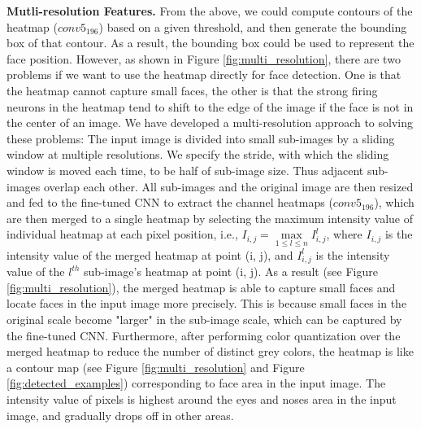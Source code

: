\documentclass[10pt,twocolumn,letterpaper]{article}
\begin{document}
{\bf Mutli-resolution Features.} From the above, we could compute contours of the heatmap ($conv5_{196}$) based on a given threshold, and then generate the bounding box of that contour. As a result, the bounding box could be used to represent the face position. However, as shown in Figure \ref{fig:multi_resolution}, there are two problems if we want to use the heatmap directly for face detection. One is that the heatmap cannot capture small faces, the other is that the strong firing neurons in the heatmap tend to shift to the edge of the image if the face is not in the center of an image. We have developed a multi-resolution approach to solving these problems: The input image is divided into small sub-images by a sliding window at multiple resolutions. We specify the stride, with which the sliding window is moved each time, to be half of sub-image size. Thus adjacent sub-images overlap each other. All sub-images and the original image are then resized and fed to the fine-tuned CNN to extract the channel heatmaps ($conv5_{196}$), which are then merged to a single heatmap by selecting the maximum intensity value of individual heatmap at each pixel position, i.e., $I_{i, j} = \max\limits_{1\leq l\leq n} I^{l}_{i, j}$, where $I_{i, j}$ is the intensity value of the merged heatmap at point (i, j), and $I^{l}_{i, j}$ is the intensity value of the $l^{th}$ sub-image's heatmap at point (i, j). As a result (see Figure \ref{fig:multi_resolution}), the merged heatmap is able to capture small faces and locate faces in the input image more precisely. This is because small faces in the original scale become "larger" in the sub-image scale, which can be captured by the fine-tuned CNN. Furthermore, after performing color quantization \cite{verevka1996local} over the merged heatmap to reduce the number of distinct grey colors, the heatmap is like a contour map (see Figure \ref{fig:multi_resolution} and Figure \ref{fig:detected_examples}) corresponding to face area in the input image. The intensity value of pixels is highest around the eyes and noses area in the input image, and gradually drops off in other areas.


\end{document}
